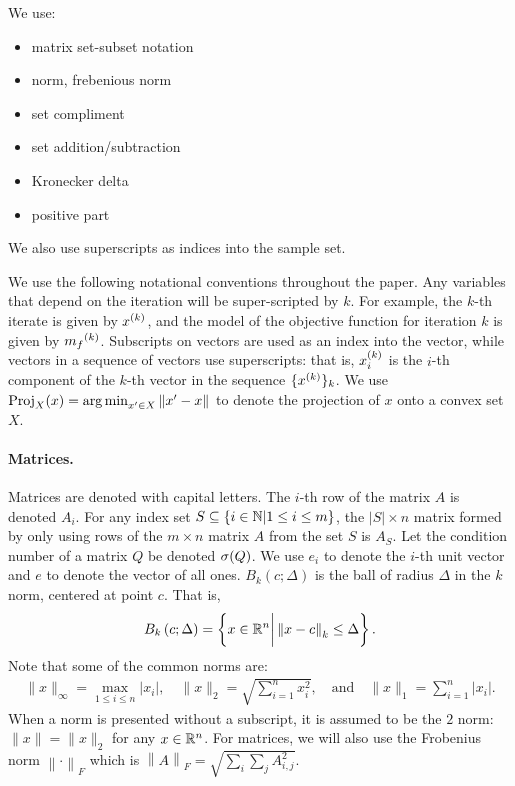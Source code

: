 \documentclass{article}
\begin{document}
We use:
\begin{itemize}
\item matrix set-subset notation
\item norm, frebenious norm
\item set compliment
\item set addition/subtraction
\item Kronecker delta
\item positive part
\end{itemize}

\color{magenta}
We also use superscripts as indices into the sample set.
\color{black}

We use the following notational conventions throughout the paper.
Any variables that depend on the iteration will be super-scripted by $k$.
For example, the $k$-th iterate is given by $x^{(k)}$,
and the model of the objective function for iteration $k$ is given by ${{m}_f}^{(k)}$.
Subscripts on vectors are used as an index into the vector, while vectors in a sequence of vectors use superscripts:
that is, $x_i^{(k)}$ is the $i$-th component of the $k$-th vector in the sequence $\{x^{(k)}\}_k$.
We use ${\textrm{Proj}}_X(x) = \operatorname*{arg\,min}_{x' \in X}\left\|x' - x\right\|$ to denote the projection of $x$ onto a convex set $X$.

\paragraph*{Matrices.}
Matrices are denoted with capital letters.
The $i$-th row of the matrix $A$ is denoted $A_i$.
For any index set $S \subseteq \{i \in \mathbb N | 1 \le i \le m\}$, the $|S| \times n$ matrix formed by only using
rows of the $m\times n$ matrix $A$ from the set $S$ is $A_S$.
Let the condition number of a matrix $Q$ be denoted ${\sigma}(Q)$.
We use $e_i$ to denote the $i$-th unit vector and $e$ to denote the vector of all ones.
$B_k\left(c; \Delta\right)$ is the ball of radius $\Delta$ in the $k$ norm, centered at point $c$.  That is,
\begin{align}
\label{define_ball}
B_k\left(c; \Delta\right) = \left\{x \in \mathbb R^n \bigg | \left\|x - c\right\|_k \le \Delta \right\}.
\end{align}
Note that some of the common norms are:
\begin{align*}
\|x\|_{\infty} = \max_{1\le i\le n}|x_i|, \quad
\|x\|_{2} = \sqrt{\sum_{i=1}^n x_i^2}, \quad \textrm{and} \quad
\|x\|_1 = \sum_{i = 1}^n |x_i|.
\end{align*}
When a norm is presented without a subscript, it is assumed to be the $2$ norm: $\|x\| = \|x\|_2$ for any $x \in \mathbb R^n$.
For matrices, we will also use the Frobenius norm $\left\|\cdot\right\|_F$ which is $\left\|A\right\|_F = \sqrt{\sum_i\sum_jA_{i, j}^2}$.
\end{document}
